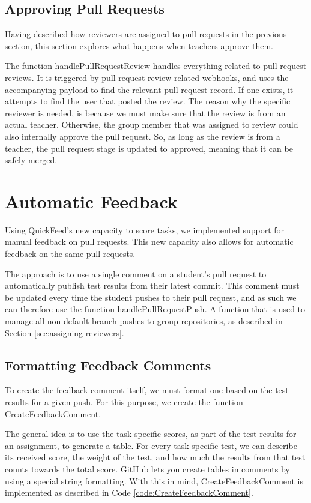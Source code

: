 \subsection{Approving Pull Requests}

Having described how reviewers are assigned to pull requests in the previous section, this section explores what happens when teachers approve them.

The function handlePullRequestReview handles everything related to pull request reviews.
It is triggered by pull request review related webhooks, and uses the accompanying payload to find the relevant pull request record.
If one exists, it attempts to find the user that posted the review.
The reason why the specific reviewer is needed, is because we must make sure that the review is from an actual teacher.
Otherwise, the group member that was assigned to review could also internally approve the pull request.
So, as long as the review is from a teacher, the pull request stage is updated to approved, meaning that it can be safely merged.

\section{Automatic Feedback}

Using QuickFeed's new capacity to score tasks, we implemented support for manual feedback on pull requests.
This new capacity also allows for automatic feedback on the same pull requests.

The approach is to use a single comment on a student's pull request to automatically publish test results from their latest commit.
This comment must be updated every time the student pushes to their pull request, and as such we can therefore use the function handlePullRequestPush.
A function that is used to manage all non-default branch pushes to group repositories, as described in Section \ref{sec:assigning-reviewers}.

\subsection{Formatting Feedback Comments}
\label{sec:formatting-feedback-comments}

To create the feedback comment itself, we must format one based on the test results for a given push.
For this purpose, we create the function CreateFeedbackComment.

The general idea is to use the task specific scores, as part of the test results for an assignment, to generate a table.
For every task specific test, we can describe its received score, the weight of the test, and how much the results from that test counts towards the total score.
GitHub lets you create tables in comments by using a special string formatting.
With this in mind, CreateFeedbackComment is implemented as described in Code \ref{code:CreateFeedbackComment}.

